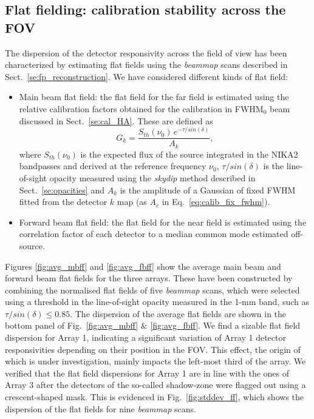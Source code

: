 \subsection{Flat fielding: calibration stability across the FOV}


The dispersion of the detector responsivity across the field of view has been characterized by estimating flat fields using the \emph{beammap} scans described in Sect.~\ref{se:fp_reconstruction}. We have considered different kinds of flat field:
\begin{itemize}
\item Main beam flat field: the flat field for the far field is estimated using the relative calibration factors obtained for the calibration in FWHM$_{0}$ beam discussed in Sect.~\ref{se:cal_HA}. These are defined as
  \begin{equation}
    G_k = \frac{S_{th}(\nu_0)\, e^{-\tau/sin(\delta)}}{A_k}, 
  \end{equation}
  where $S_{th}(\nu_0)$ is the expected flux of the source integrated in the NIKA2 bandpasses and derived at the reference frequency $\nu_0$, $\tau/sin(\delta)$ is the line-of-sight opacity measured using the \emph{skydip} method described in Sect.~\ref{se:opacities} and $A_k$ is the amplitude of a Gaussian of fixed FWHM fitted from the detector $k$ map (as $A_{c}$ in Eq.~\ref{eq:calib_fix_fwhm}).
\item Forward beam flat field: the flat field for the near field is estimated using the correlation factor of each detector to a median common mode estimated off-source.
\end{itemize}

Figures \ref{fig:avg_mbff} and \ref{fig:avg_fbff} show the average main beam and forward beam flat fields for the three arrays. These have been constructed by combining the normalised flat fields of five \emph{beammap} scans, which were selected using a threshold in the line-of-sight opacity measured in the 1-mm band, such as $\tau/sin(\delta) \leq 0.85$. The dispersion of the average flat fields are shown in the bottom panel of Fig.~\ref{fig:avg_mbff} $\&$ \ref{fig:avg_fbff}. We find a sizable flat field dispersion for Array 1, indicating a significant variation of Array 1 detector responsivities depending on their position in the FOV. This effect, the origin of which is under investigation, mainly impacts the left-most third of the array. We verified that the flat field dispersions for Array 1 are in line with the ones of Array 3 after the detectors of the so-called shadow-zone were flagged out using a crescent-shaped mask. This is evidenced in Fig.~\ref{fig:stddev_ff}, which shows the dispersion of the flat fields for nine \emph{beammap} scans.      


